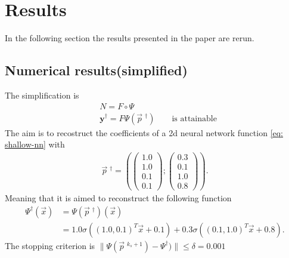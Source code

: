 \section{Results}
In the following section the results presented in the paper
\cite{scherzer2023newton} are rerun.
\subsection{Numerical results(simplified)}
The simplification is
\begin{align}
    &N = F \circ \Psi \\
    &\mathbf{y}^{\dagger} = F\Psi(\vec{p}\;^{\dagger}) \qquad \text{is
    attainable}
\end{align}
The aim is to recostruct the coefficients of a 2d neural network function
\ref{eq: shallow-nn} with
\begin{align}
    \vec{p}\;^{\dagger} = \left(
        \begin{pmatrix} 1.0\\1.0\\0.1\\0.1 \end{pmatrix};
        \begin{pmatrix} 0.3\\0.1\\1.0\\0.8 \end{pmatrix} \right).
\end{align}
Meaning that it is aimed to reconstruct the following function
\begin{align}
    \Psi^{\dagger}(\vec{x})
    &= \Psi(\vec{p}\;^{\dagger})(\vec{x})\\
    &=1.0\sigma\left( (1.0,0.1)^{T}\vec{x} + 0.1 \right)
    +0.3 \sigma\left( (0.1, 1.0)^{T}\vec{x} + 0.8 \right).
\end{align}
The stopping criterion is $\|\Psi(\vec{p}\;^{k_s+1}) - \Psi^{\dagger})\| \le
\delta = 0.001$

